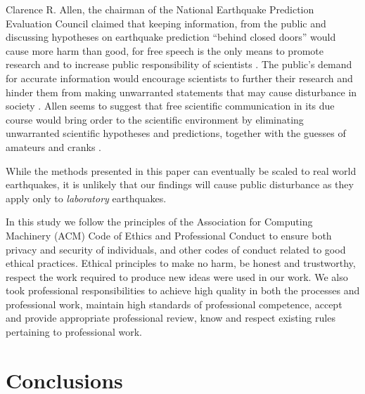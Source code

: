 \documentclass[]{llncs} %
\begin{document}
Clarence R. Allen, the chairman of the National Earthquake Prediction Evaluation Council claimed that keeping information, from the public and discussing hypotheses on earthquake prediction “behind closed doors” would cause more harm than good, for free speech is the only means to promote research and to increase public responsibility of scientists \cite{Ayhan}. The public’s demand for accurate information would encourage scientists to further their research and hinder them from making unwarranted statements that may cause disturbance in society \cite{Ayhan}. Allen seems to suggest that free scientific communication in its due course would bring order to the scientific environment by eliminating unwarranted scientific hypotheses and predictions, together with the guesses of amateurs and cranks \cite{Ayhan}. \par
While the methods presented in this paper can eventually be scaled to real world earthquakes, it is unlikely that our findings will cause public disturbance as they apply only to \emph{laboratory} earthquakes. \par
In this study we follow the principles of the Association for Computing Machinery (ACM) Code of Ethics and Professional Conduct \cite{ACM} to ensure both privacy and security of individuals, and other codes of conduct related to good ethical practices. Ethical principles to make no harm, be honest and trustworthy, respect the work required to produce new ideas were used in our work. We also took professional responsibilities to achieve high quality in both the processes and professional work, maintain high standards of professional competence, accept and provide appropriate professional review, know and respect existing rules pertaining to professional work. \par

\section{Conclusions}
\end{document}
